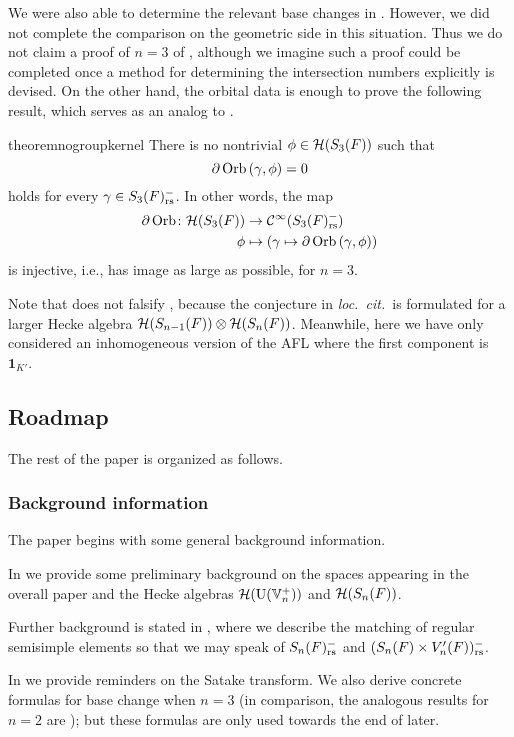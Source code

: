 We were also able to determine the
relevant base changes in .
However, we did not complete the comparison on the geometric side in this situation.
Thus we do not claim a proof of $n = 3$ of ,
although we imagine such a proof could be completed
once a method for determining the intersection numbers explicitly is devised.
On the other hand, the orbital data is enough to prove the following result,
which serves as an analog to .
\begin{restatable}{theorem}{nogroupkernel}
  \label{thm:no_kernel_group}
  There is no nontrivial $\phi \in \mathcal H(S_3(F))$ such that
  \[ \partial \operatorname{Orb} \left( \gamma, \phi \right) = 0 \]
  holds for every $\gamma \in S_3(F)_{\mathrm{rs}}^-$.
  In other words, the map
  \begin{align*}
    \partial\operatorname{Orb} \colon \mathcal H(S_3(F)) &\to \mathcal{C}^\infty(S_3(F)_{\mathrm{rs}}^-) \\
    \phi &\mapsto \left( \gamma \mapsto \partial \operatorname{Orb} \left(\gamma, \phi \right) \right)
  \end{align*}
  is injective, i.e., has image as large as possible, for $n = 3$.
\end{restatable}
\begin{remark}
  Note that  does not falsify
  \cite[Conjecture 1.0.2]{ref:AFLspherical},
  because the conjecture in \emph{loc.\ cit.}\ is formulated
  for a larger Hecke algebra $\mathcal H(S_{n-1}(F)) \otimes \mathcal H(S_n(F))$.
  Meanwhile, here we have only considered an inhomogeneous version of the AFL
  where the first component is $\mathbf{1}_{K'}$.
\end{remark}

\subsection{Roadmap}
The rest of the paper is organized as follows.

\subsubsection{Background information}
The paper begins with some general background information.
\begin{itemize}
  \ii In  we provide some preliminary background
  on the spaces appearing in the overall paper and the Hecke algebras
  $\mathcal H(\operatorname{U}(\mathbb V_n^+))$ and $\mathcal H(S_n(F))$.

  \ii Further background is stated in ,
  where we describe the matching of regular semisimple elements
  so that we may speak of $S_n(F)_{\mathrm{rs}}^-$ and $(S_n(F) \times V'_n(F))_{\mathrm{rs}}^-$.

  \ii In  we provide reminders on the Satake transform.
  We also derive concrete formulas for base change when $n = 3$
  (in comparison, the analogous results for $n=2$ are
  \cite[Lemma 7.1.1]{ref:AFLspherical});
  but these formulas are only used towards the end of  later.
\end{itemize}

